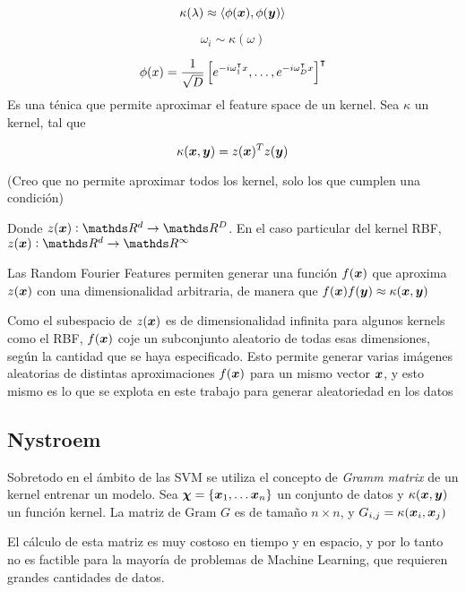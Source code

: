 \documentclass{article}
\begin{document}
\begin{equation}
  \kappa(\lambda) \approx \langle\phi(\bm{x}), \phi(\bm{y})\rangle
\end{equation}

\begin{equation}
  \omega_i \sim \kappa(\omega)
\end{equation}

\begin{equation}
  \phi(x) = \frac{1}{\sqrt{D}}\left[ e^{-i\omega^\intercal_1x}, \ldots, e^{-i\omega^\intercal_Dx} \right]^\intercal
\end{equation}
Es una ténica que permite aproximar el feature space de un kernel. Sea $\kappa$
un kernel, tal que

\begin{equation}
 \kappa(\bm{x}, \bm{y}) = z(\bm{x})^Tz(\bm{y})
\end{equation}

(Creo que no permite aproximar todos los kernel, solo los que cumplen una condición)

Donde
$z(\vx) : \reals^d \rightarrow \reals^D$.
En el caso particular del
kernel RBF,
$z(\vx) : \reals^d \rightarrow \reals^\infty$

Las Random Fourier Features permiten generar una función $f(\bm{x})$ que aproxima $z(\bm{x})$
con una dimensionalidad arbitraria, de manera que
$f(\bm{x})f(\bm{y}) \approx \kappa(\bm{x}, \bm{y})$

Como el subespacio de $z(\bm{x})$ es de dimensionalidad infinita para algunos kernels
como el RBF, $f(\bm{x})$ coje un subconjunto aleatorio de todas esas dimensiones,
según la cantidad que se haya especificado. Esto permite generar varias imágenes
aleatorias de distintas aproximaciones $f(\bm{x})$ para un mismo vector $\bm{x}$, y esto
mismo es lo que se explota en este trabajo para generar aleatoriedad en los datos

\subsection{Nystroem}

Sobretodo en el ámbito de las SVM se utiliza el concepto de \textit{Gramm matrix}
de un kernel entrenar un modelo. Sea
$\bm{\chi} = \{\bm{x}_1, \ldots \bm{x}_n\}$
un conjunto de datos y
$\kappa(\bm{x}, \bm{y})$
un función kernel. La matriz de Gram $G$
es de tamaño $n \times n$, y
$G_{i,j} = \kappa(\bm{x}_i, \bm{x}_j)$

El cálculo de esta matriz es muy costoso en tiempo y en espacio, y por lo tanto
no es factible para la mayoría de problemas de Machine Learning, que requieren
grandes cantidades de datos.
\end{document}
